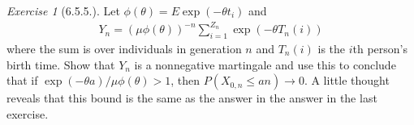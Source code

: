 \documentclass[12pt,a4paper]{amsart}
\theoremstyle{plain}
\theoremstyle{definition}
\theoremstyle{remark}
\newtheorem*{exe}{Exercise}
\numberwithin{equation}{section}
\begin{document}
\begin{exe}[6.5.5.]
Let $\phi(\theta) = E \exp(-\theta t_i)$ and
\begin{align}
Y_n =\left( \mu \phi(\theta) \right)^{-n} \sum_{i=1}^{Z_n} \exp\left( -\theta T_n(i) \right)
\end{align}
where the sum is over individuals in generation $n$ and $T_n(i)$ is the $i$th person's birth time.
Show that $Y_n$ is a nonnegative martingale and use this to conclude that if $\exp(-\theta a)/\mu \phi(\theta) > 1$, then $P(X_{0,n}\leq an)\to 0$. 
A little thought reveals that this bound is the same as the answer in the answer in the last exercise.
\end{exe}
\end{document}
